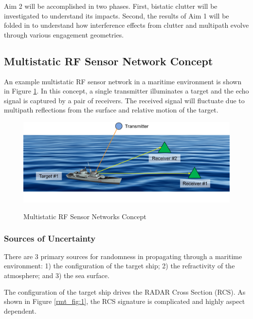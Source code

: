 Aim 2 will be accomplished in two phases. First, bistatic clutter will be investigated to understand its impacts. Second, the results of Aim 1 will be folded in to understand how interference effects from clutter and multipath evolve through various engagement geometries.

\subsection{Multistatic RF Sensor Network Concept}
An example multistatic RF sensor network in a maritime environment is shown in Figure \ref{ms_fig:1}. In this concept, a single transmitter illuminates a target and the echo signal is captured by a pair of receivers. The received signal will fluctuate due to multipath reflections from the surface and relative motion of the target.

\begin{figure}[H]
  \begin{center}
\includegraphics[width=5in]{../media/multistatic/ms_rf_concept.png}
  \end{center}
  \renewcommand{\baselinestretch}{1} \small\normalsize
  \begin{quote}
    \caption[Multistatic RF Sensor Networks Concept]{Multistatic RF Sensor Networks Concept\label{ms_fig:1}}
  \end{quote}
\end{figure}
\renewcommand{\baselinestretch}{2} \small\normalsize

\subsubsection{Sources of Uncertainty}
There are 3 primary sources for randomness in propagating through a maritime environment: 1) the configuration of the target ship; 2) the refractivity of the atmosphere; and 3) the sea surface.

The configuration of the target ship drives the RADAR Cross Section (RCS). As shown in Figure \ref{rmt_fig:1}, the RCS signature is complicated and highly aspect dependent. 

